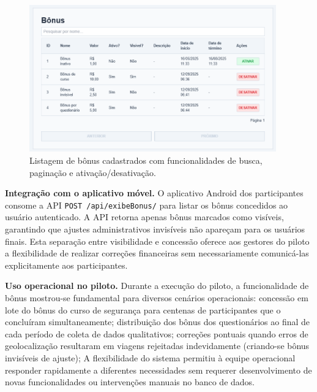 \begin{figure}[H]
    \centering
    \includegraphics[width=0.95\textwidth]{figuras/bonus_listar.PNG}
    \caption{Listagem de bônus cadastrados com funcionalidades de busca, paginação e ativação/desativação.}
    \label{fig:bonus_listagem_form}
  \end{figure}
 

\textbf{Integração com o aplicativo móvel.} O aplicativo Android dos participantes
consome a API \texttt{POST /api/exibeBonus/} para listar os bônus concedidos ao
usuário autenticado. A API retorna apenas bônus marcados como visíveis, garantindo que ajustes administrativos invisíveis não
apareçam para os usuários finais. Esta separação entre visibilidade e concessão
oferece aos gestores do piloto a flexibilidade de realizar correções financeiras
sem necessariamente comunicá-las explicitamente aos participantes.

\textbf{Uso operacional no piloto.} Durante a execução do piloto, a
funcionalidade de bônus mostrou-se fundamental para diversos cenários operacionais:
concessão em lote do bônus do curso de segurança para centenas de participantes que
o concluíram simultaneamente; distribuição dos bônus dos questionários ao final de
cada período de coleta de dados qualitativos; correções pontuais quando erros de
geolocalização resultaram em viagens rejeitadas indevidamente (criando-se bônus
invisíveis de ajuste); A flexibilidade do sistema permitiu à
equipe operacional responder rapidamente a diferentes necessidades sem requerer
desenvolvimento de novas funcionalidades ou intervenções manuais no banco de dados.



